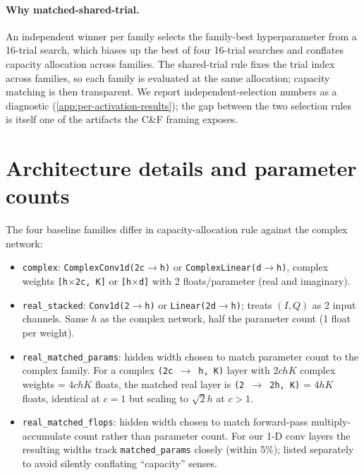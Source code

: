 \documentclass{article}
\providecommand{\Cref}[1]{\autoref{#1}}
\newcommand{\code}[1]{\texttt{#1}}
\begin{document}
\paragraph{Why matched-shared-trial.} An independent winner per family
selects the family-best hyperparameter from a 16-trial search, which
biases up the best of four 16-trial searches and conflates capacity
allocation across families. The shared-trial rule fixes the trial
index across families, so each family is evaluated at the same
allocation; capacity matching is then transparent. We report
independent-selection numbers as a diagnostic
(\Cref{app:per-activation-results}); the gap between the two
selection rules is itself one of the artifacts the C\&F framing
exposes.

\section{Architecture details and parameter counts}
\label{app:architectures}

The four baseline families differ in capacity-allocation rule against
the complex network:

\begin{itemize}
  \item \code{complex}: \code{ComplexConv1d(2c$\to$h)} or
    \code{ComplexLinear(d$\to$h)}, complex weights \texttt{[h$\times$2c, K]} or
    \texttt{[h$\times$d]} with 2 floats/parameter (real and imaginary).
  \item \code{real\_stacked}: \code{Conv1d(2$\to$h)} or
    \code{Linear(2d$\to$h)}; treats $(I, Q)$ as 2 input channels.
    Same $h$ as the complex network, half the parameter count
    (1 float per weight).
  \item \code{real\_matched\_params}: hidden width chosen to match
    parameter count to the complex family. For a complex
    \code{(2c $\to$ h, K)} layer with $2chK$ complex weights = $4chK$
    floats, the matched real layer is \code{(2 $\to$ 2h, K)} = $4hK$
    floats, identical at $c=1$ but scaling to $\sqrt{2} h$ at $c > 1$.
  \item \code{real\_matched\_flops}: hidden width chosen to match
    forward-pass multiply-accumulate count rather than parameter count.
    For our 1-D conv layers the resulting widths track
    \code{matched\_params} closely (within 5\%); listed separately to
    avoid silently conflating ``capacity'' senses.
\end{itemize}
\end{document}
